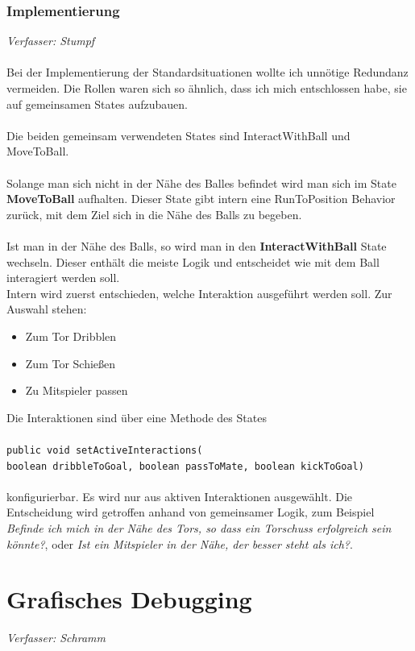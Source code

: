 \documentclass[fontsize=12pt,a4paper,final]{scrartcl}[2003/01/01]
\begin{document}
\subsubsection{Implementierung}
\textit{Verfasser: Stumpf}\\
\\
Bei der Implementierung der Standardsituationen wollte ich unnötige Redundanz vermeiden. Die Rollen waren sich so ähnlich, dass ich mich entschlossen habe, sie auf gemeinsamen States aufzubauen.\\
\\
Die beiden gemeinsam verwendeten States sind InteractWithBall und MoveToBall.\\
\\
Solange man sich nicht in der Nähe des Balles befindet wird man sich im State \textbf{MoveToBall} aufhalten. Dieser State gibt intern eine RunToPosition Behavior zurück, mit dem Ziel sich in die Nähe des Balls zu begeben.\\
\\
Ist man in der Nähe des Balls, so wird man in den \textbf{InteractWithBall} State wechseln. Dieser enthält die meiste Logik und entscheidet wie mit dem Ball interagiert werden soll.\\ 
Intern wird zuerst entschieden, welche Interaktion ausgeführt werden soll. Zur Auswahl stehen:
\begin{itemize}
\item Zum Tor Dribblen
\item Zum Tor Schießen
\item Zu Mitspieler passen
\end{itemize}
Die Interaktionen sind über eine Methode des States \\
\\
\texttt{public void setActiveInteractions(\\boolean dribbleToGoal, boolean passToMate, boolean kickToGoal)}\\
\\
konfigurierbar. Es wird nur aus aktiven Interaktionen ausgewählt.
Die Entscheidung wird getroffen anhand von gemeinsamer Logik, zum Beispiel \textit{\glqq Befinde ich mich in der Nähe des Tors, so dass ein Torschuss erfolgreich sein könnte?\grqq}, oder \textit{\glqq Ist ein Mitspieler in der Nähe, der besser steht als ich?\grqq}.

\section{Grafisches Debugging}\label{se:Grafisches Debugging}
\textit{Verfasser: Schramm}\\
\\

\end{document}
